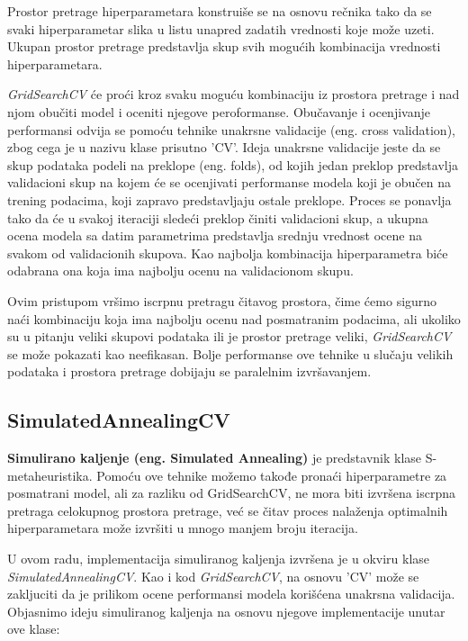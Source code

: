 \documentclass{article}
\begin{document}
\noindent Prostor pretrage hiperparametara konstruiše se na osnovu rečnika tako da se svaki hiperparametar slika u listu unapred zadatih vrednosti koje može uzeti. Ukupan prostor pretrage predstavlja skup svih mogućih kombinacija vrednosti hiperparametara. \newline

\noindent \textit{GridSearchCV} će proći kroz svaku moguću kombinaciju iz prostora pretrage i nad njom obučiti model i oceniti njegove peroformanse. Obučavanje i ocenjivanje performansi odvija se pomoću tehnike unakrsne validacije (eng. cross validation), zbog cega je u nazivu klase prisutno 'CV'. Ideja unakrsne validacije jeste da se skup podataka podeli na preklope (eng. folds), od kojih jedan preklop predstavlja validacioni skup na kojem će se ocenjivati performanse modela koji je obučen na trening podacima, koji zapravo predstavljaju ostale preklope. Proces se ponavlja tako da će u svakoj iteraciji sledeći preklop činiti validacioni skup, a ukupna ocena modela sa datim parametrima predstavlja srednju vrednost ocene na svakom od validacionih skupova. Kao najbolja kombinacija hiperparametra biće odabrana ona koja ima najbolju ocenu na validacionom skupu. \newline

\noindent Ovim pristupom vršimo iscrpnu pretragu čitavog prostora, čime ćemo sigurno naći kombinaciju koja ima najbolju ocenu nad posmatranim podacima, ali ukoliko su u pitanju veliki skupovi podataka ili je prostor pretrage veliki, \textit{GridSearchCV} se može pokazati kao neefikasan. Bolje performanse ove tehnike u slučaju velikih podataka i prostora pretrage dobijaju se paralelnim izvršavanjem.
\newpage
\subsection{SimulatedAnnealingCV}
\vspace{0.25 cm}
\textbf{Simulirano kaljenje (eng. Simulated Annealing)} je predstavnik klase S-metaheuristika. Pomoću ove tehnike možemo takođe pronaći hiperparametre za posmatrani model, ali za razliku od GridSearchCV, ne mora biti izvršena iscrpna pretraga celokupnog prostora pretrage, već se čitav proces nalaženja optimalnih hiperparametara može izvršiti u mnogo manjem broju iteracija.\newline

\noindent U ovom radu, implementacija simuliranog kaljenja izvršena je u okviru klase \textit{SimulatedAnnealingCV}. Kao i kod \textit{GridSearchCV}, na osnovu 'CV' može se zakljuciti da je prilikom ocene performansi modela korišćena unakrsna validacija. Objasnimo ideju simuliranog kaljenja na osnovu njegove implementacije unutar ove klase:
\end{document}
